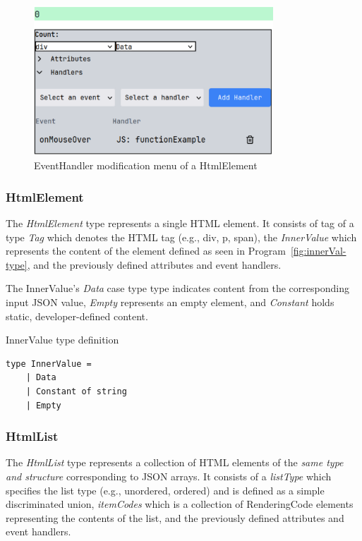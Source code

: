 \begin{figure}[htbp]
	\begin{center}
		\includegraphics[width=0.8\textwidth]{img/handler-menu.pdf}
	\end{center}
	\caption{EventHandler modification menu of a HtmlElement}\label{fig:handler-menu}
\end{figure}

\subsubsection{HtmlElement}
The \emph{HtmlElement} type represents a single HTML element.
It consists of tag of a type \emph{Tag} which denotes the HTML tag (e.g., div, p, span),
the \emph{InnerValue} which represents the content of the element defined as seen in Program~\ref{fig:innerVal-type}, and the previously defined attributes and event handlers.

The InnerValue's \emph{Data} case type type indicates content from the corresponding input JSON value, \emph{Empty} represents an empty element, and \emph{Constant} holds static, developer-defined content.

\begin{listing}[htbp]
	\caption{InnerValue type definition}
	\label{fig:innerVal-type}
	\begin{lstlisting}
type InnerValue =
    | Data
    | Constant of string
    | Empty
    \end{lstlisting}
\end{listing}

\subsubsection{HtmlList}
The \emph{HtmlList} type represents a collection of HTML elements of the \emph{same type and structure} corresponding to JSON arrays.
It consists of a \emph{listType} which specifies the list type (e.g., unordered, ordered) and is defined as a simple discriminated union,
\emph{itemCodes} which is a collection of RenderingCode elements representing the contents of the list, and the previously defined attributes and event handlers.


